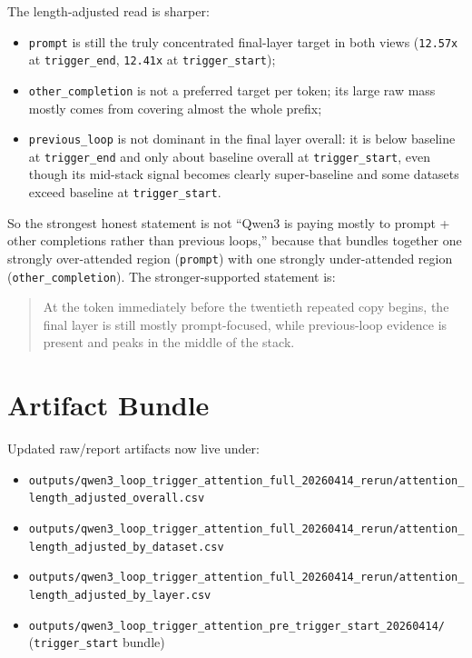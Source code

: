 \documentclass[11pt]{article}
\begin{document}
The length-adjusted read is sharper:

\begin{itemize}
  \item \texttt{prompt} is still the truly concentrated final-layer target in both views (\texttt{12.57x} at \texttt{trigger\_end}, \texttt{12.41x} at \texttt{trigger\_start});
  \item \texttt{other\_completion} is not a preferred target per token; its large raw mass mostly comes from covering almost the whole prefix;
  \item \texttt{previous\_loop} is not dominant in the final layer overall: it is below baseline at \texttt{trigger\_end} and only about baseline overall at \texttt{trigger\_start}, even though its mid-stack signal becomes clearly super-baseline and some datasets exceed baseline at \texttt{trigger\_start}.
\end{itemize}

So the strongest honest statement is not ``Qwen3 is paying mostly to prompt + other completions rather than previous loops,'' because that bundles together one strongly over-attended region (\texttt{prompt}) with one strongly under-attended region (\texttt{other\_completion}). The stronger-supported statement is:

\begin{quote}
At the token immediately before the twentieth repeated copy begins, the final layer is still mostly prompt-focused, while previous-loop evidence is present and peaks in the middle of the stack.
\end{quote}

\section*{Artifact Bundle}

Updated raw/report artifacts now live under:

\begin{itemize}
  \item \texttt{outputs/qwen3\_loop\_trigger\_attention\_full\_20260414\_rerun/attention\_length\_adjusted\_overall.csv}
  \item \texttt{outputs/qwen3\_loop\_trigger\_attention\_full\_20260414\_rerun/attention\_length\_adjusted\_by\_dataset.csv}
  \item \texttt{outputs/qwen3\_loop\_trigger\_attention\_full\_20260414\_rerun/attention\_length\_adjusted\_by\_layer.csv}
  \item \texttt{outputs/qwen3\_loop\_trigger\_attention\_pre\_trigger\_start\_20260414/} (\texttt{trigger\_start} bundle)
\end{itemize}
\end{document}
